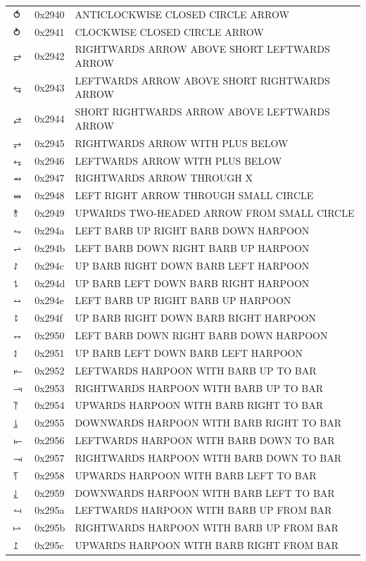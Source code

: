 \documentclass[12pt, twoside]{article}
\begin{document}
\begin{longtable}{L{1.0cm} L{2.0cm} >{\footnotesize}L{10cm}}
$⥀$&0x2940&ANTICLOCKWISE CLOSED CIRCLE ARROW\\
$⥁$&0x2941&CLOCKWISE CLOSED CIRCLE ARROW\\
$⥂$&0x2942&RIGHTWARDS ARROW ABOVE SHORT LEFTWARDS ARROW\\
$⥃$&0x2943&LEFTWARDS ARROW ABOVE SHORT RIGHTWARDS ARROW\\
$⥄$&0x2944&SHORT RIGHTWARDS ARROW ABOVE LEFTWARDS ARROW\\
$⥅$&0x2945&RIGHTWARDS ARROW WITH PLUS BELOW\\
$⥆$&0x2946&LEFTWARDS ARROW WITH PLUS BELOW\\
$⥇$&0x2947&RIGHTWARDS ARROW THROUGH X\\
$⥈$&0x2948&LEFT RIGHT ARROW THROUGH SMALL CIRCLE\\
$⥉$&0x2949&UPWARDS TWO-HEADED ARROW FROM SMALL CIRCLE\\
$⥊$&0x294a&LEFT BARB UP RIGHT BARB DOWN HARPOON\\
$⥋$&0x294b&LEFT BARB DOWN RIGHT BARB UP HARPOON\\
$⥌$&0x294c&UP BARB RIGHT DOWN BARB LEFT HARPOON\\
$⥍$&0x294d&UP BARB LEFT DOWN BARB RIGHT HARPOON\\
$⥎$&0x294e&LEFT BARB UP RIGHT BARB UP HARPOON\\
$⥏$&0x294f&UP BARB RIGHT DOWN BARB RIGHT HARPOON\\
$⥐$&0x2950&LEFT BARB DOWN RIGHT BARB DOWN HARPOON\\
$⥑$&0x2951&UP BARB LEFT DOWN BARB LEFT HARPOON\\
$⥒$&0x2952&LEFTWARDS HARPOON WITH BARB UP TO BAR\\
$⥓$&0x2953&RIGHTWARDS HARPOON WITH BARB UP TO BAR\\
$⥔$&0x2954&UPWARDS HARPOON WITH BARB RIGHT TO BAR\\
$⥕$&0x2955&DOWNWARDS HARPOON WITH BARB RIGHT TO BAR\\
$⥖$&0x2956&LEFTWARDS HARPOON WITH BARB DOWN TO BAR\\
$⥗$&0x2957&RIGHTWARDS HARPOON WITH BARB DOWN TO BAR\\
$⥘$&0x2958&UPWARDS HARPOON WITH BARB LEFT TO BAR\\
$⥙$&0x2959&DOWNWARDS HARPOON WITH BARB LEFT TO BAR\\
$⥚$&0x295a&LEFTWARDS HARPOON WITH BARB UP FROM BAR\\
$⥛$&0x295b&RIGHTWARDS HARPOON WITH BARB UP FROM BAR\\
$⥜$&0x295c&UPWARDS HARPOON WITH BARB RIGHT FROM BAR\\

\end{longtable}
\end{document}
